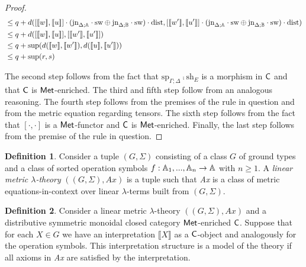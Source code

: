 \documentclass[10pt,a4paper]{amsart}
\theoremstyle{definition}
\newtheorem{definition}{Definition}[section]
\theoremstyle{definition}
\theoremstyle{definition}
\theoremstyle{definition}
\theoremstyle{definition}
\theoremstyle{definition}
\begin{document}
\begin{proof}
\begin{align*}
    & \leq q +  d( [\llbracket w\rrbracket ,\llbracket u\rrbracket] \cdot (\text{jn}_{\Delta;\mathbb{A}}\cdot \mathrm{sw} \oplus \text{jn}_{\Delta;\mathbb{B}}\cdot \mathrm{sw}) \cdot \mathrm{dist},  [\llbracket w'\rrbracket ,\llbracket u'\rrbracket] \cdot (\text{jn}_{\Delta;\mathbb{A}}\cdot \mathrm{sw} \oplus \text{jn}_{\Delta;\mathbb{B}}\cdot \mathrm{sw}) \cdot \mathrm{dist}) \\
    & \leq q +  d( [\llbracket w\rrbracket ,\llbracket u\rrbracket],  [\llbracket w'\rrbracket ,\llbracket u'\rrbracket]) \\
    & \leq q + \sup(d( \llbracket w\rrbracket , \llbracket w' \rrbracket), d( \llbracket u\rrbracket , \llbracket u' \rrbracket)) \\
    & \leq q + \sup(r, s) \\
  \end{align*}
  
   The second step follows from the fact that $\text{sp}_{\Gamma;\Delta} \comp \text{sh}_{E}$  is a morphism in $\mathsf{C}$  and that $\mathsf{C}$ is $\mathsf{Met}$-enriched.  The third and fifth step follow from an analogous reasoning. The fourth step follows from  the premises of the rule in question and from the metric equation regarding tensors. The sixth step follows from the fact that $[ \cdot , \cdot ]$ is a $\mathsf{Met}$-functor and $\mathsf{C}$  is $\mathsf{Met}$-enriched. Finally, the last step follows from the premise of the rule in question.

\end{proof}

\begin{definition}
Consider a tuple $(G,\Sigma)$ consisting of a class $G$ of ground
 types and a class of sorted operation symbols $f : \mathbb{A}_1,...,\mathbb{A}_n \rightarrow \mathbb{A}$ with $n \geq 1$. A \emph{linear metric $\lambda$-theory} $((G,\Sigma),\textit{Ax})$ is a tuple such that \textit{Ax} is a class of metric equations-in-context over linear $\lambda$-terms built from $(G,\Sigma)$.
\end{definition}

\begin{definition}
  Consider a linear metric $\lambda$-theory $((G,\Sigma),\textit{Ax})$ and a distributive symmetric monoidal closed category $\mathsf{Met}$-enriched $\mathsf{C}$. Suppose that for each $X \in G$ we have an interpretation $\llbracket X \rrbracket$ as a $\mathsf{C}$-object and analogously for the operation symbols. This interpretation structure is a model of the theory if all axioms in \textit{Ax} are satisfied by the interpretation.
\end{definition}
\end{document}
